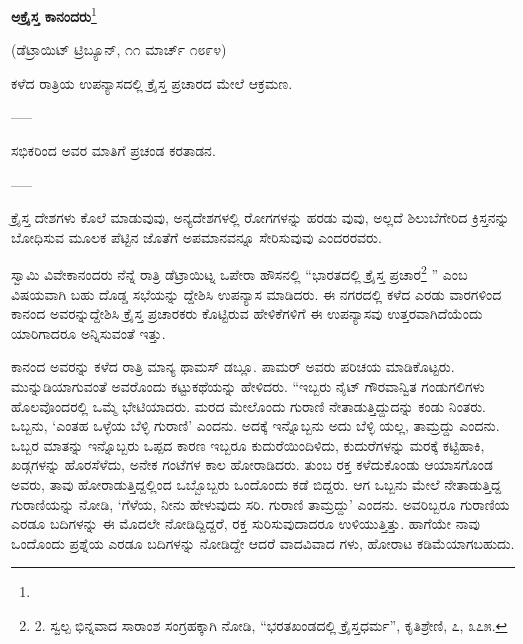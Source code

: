 \begin{center}
\textbf{ಅಕ್ರೈಸ್ತ ಕಾನಂದರು}\footnote{}
\end{center}

\begin{center}
(ಡೆಟ್ರಾಯಿಟ್ ಟ್ರಿಬ್ಯೂನ್, ೧೧ ಮಾರ್ಚ್ ೧೮೯೪)
\end{center}

\begin{center}
ಕಳೆದ ರಾತ್ರಿಯ ಉಪನ್ಯಾಸದಲ್ಲಿ ಕ್ರೈಸ್ತ ಪ್ರಚಾರದ ಮೇಲೆ ಆಕ್ರಮಣ.
\end{center}

\begin{center}
-----
\end{center}

\begin{center}
ಸಭಿಕರಿಂದ ಅವರ ಮಾತಿಗೆ ಪ್ರಚಂಡ ಕರತಾಡನ.
\end{center}

\begin{center}
-----
\end{center}

ಕ್ರೈಸ್ತ ದೇಶಗಳು ಕೊಲೆ ಮಾಡುವುವು, ಅನ್ಯದೇಶಗಳಲ್ಲಿ ರೋಗಗಳನ್ನು ಹರಡು ವುವು, ಅಲ್ಲದೆ ಶಿಲುಬೆಗೇರಿದ ಕ್ರಿಸ್ತನನ್ನು ಬೋಧಿಸುವ ಮೂಲಕ ಪೆಟ್ಟಿನ ಜೊತೆಗೆ ಅಪಮಾನವನ್ನೂ ಸೇರಿಸುವುವು ಎಂದರರವರು.

ಸ್ವಾಮಿ ವಿವೇಕಾನಂದರು ನೆನ್ನೆ ರಾತ್ರಿ ಡೆಟ್ರಾಯಿಟ್ನ ಒಪೇರಾ ಹೌಸನಲ್ಲಿ “ಭಾರತದಲ್ಲಿ ಕ್ರೈಸ್ತ ಪ್ರಚಾರ\footnote{2. ಸ್ವಲ್ಪ ಭಿನ್ನವಾದ ಸಾರಾಂಶ ಸಂಗ್ರಹಕ್ಕಾಗಿ ನೋಡಿ, “ಭರತಖಂಡದಲ್ಲಿ ಕ್ರೈಸ್ತಧರ್ಮ”, ಕೃತಿಶ್ರೇಣಿ, ೭, ೩೭೫.} ” ಎಂಬ ವಿಷಯವಾಗಿ ಬಹು ದೊಡ್ಡ ಸಭೆಯನ್ನು ದ್ದೇಶಿಸಿ ಉಪನ್ಯಾಸ ಮಾಡಿದರು. ಈ ನಗರದಲ್ಲಿ ಕಳೆದ ಎರಡು ವಾರಗಳಿಂದ ಕಾನಂದ ಅವರನ್ನುದ್ದೇಶಿಸಿ ಕ್ರೈಸ್ತ ಪ್ರಚಾರಕರು ಕೊಟ್ಟಿರುವ ಹೇಳಿಕೆಗಳಿಗೆ ಈ ಉಪನ್ಯಾಸವು ಉತ್ತರವಾಗಿದೆಯೆಂದು ಯಾರಿಗಾದರೂ ಅನ್ನಿಸುವಂತೆ ಇತ್ತು.

ಕಾನಂದ ಅವರನ್ನು ಕಳೆದ ರಾತ್ರಿ ಮಾನ್ಯ ಥಾಮಸ್ ಡಬ್ಲೂ. ಪಾಮರ್ ಅವರು ಪರಿಚಯ ಮಾಡಿಕೊಟ್ಟರು. ಮುನ್ನುಡಿಯಾಗುವಂತೆ ಅವರೊಂದು ಕಟ್ಟುಕಥೆಯನ್ನು ಹೇಳಿದರು. “ಇಬ್ಬರು ನೈಟ್ ಗೌರವಾನ್ವಿತ ಗಂಡುಗಲಿಗಳು ಹೊಲವೊಂದರಲ್ಲಿ ಒಮ್ಮೆ ಭೇಟಿಯಾದರು. ಮರದ ಮೇಲೊಂದು ಗುರಾಣಿ ನೇತಾಡುತ್ತಿದ್ದುದನ್ನು ಕಂಡು ನಿಂತರು. ಒಬ್ಬನು, ‘ಎಂತಹ ಒಳ್ಳೆಯ ಬೆಳ್ಳಿ ಗುರಾಣಿ’ ಎಂದನು. ಅದಕ್ಕೆ ಇನ್ನೊಬ್ಬನು ಅದು ಬೆಳ್ಳಿ ಯಲ್ಲ, ತಾಮ್ರದ್ದು ಎಂದನು. ಒಬ್ಬರ ಮಾತನ್ನು ಇನ್ನೊಬ್ಬರು ಒಪ್ಪದ ಕಾರಣ ಇಬ್ಬರೂ ಕುದುರೆಯಿಂದಿಳಿದು, ಕುದುರೆಗಳನ್ನು ಮರಕ್ಕೆ ಕಟ್ಟಿಹಾಕಿ, ಖಡ್ಗಗಳನ್ನು ಹೊರಸೆಳೆದು, ಅನೇಕ ಗಂಟೆಗಳ ಕಾಲ ಹೋರಾಡಿದರು. ತುಂಬ ರಕ್ತ ಕಳೆದುಕೊಂಡು ಆಯಾಸಗೊಂಡ ಅವರು, ತಾವು ಹೋರಾಡುತ್ತಿದ್ದಲ್ಲಿಂದ ಒಬ್ಬೊಬ್ಬರು ಒಂದೊಂದು ಕಡೆ ಬಿದ್ದರು. ಆಗ ಒಬ್ಬನು ಮೇಲೆ ನೇತಾಡುತ್ತಿದ್ದ ಗುರಾಣಿಯನ್ನು ನೋಡಿ, ‘ಗೆಳೆಯ, ನೀನು ಹೇಳುವುದು ಸರಿ. ಗುರಾಣಿ ತಾಮ್ರದ್ದು’ ಎಂದನು. ಅವರಿಬ್ಬರೂ ಗುರಾಣಿಯ ಎರಡೂ ಬದಿಗಳನ್ನು ಈ ಮೊದಲೇ ನೋಡಿದ್ದಿದ್ದರೆ, ರಕ್ತ ಸುರಿಸುವುದಾದರೂ ಉಳಿಯುತ್ತಿತ್ತು. ಹಾಗೆಯೇ ನಾವು ಒಂದೊಂದು ಪ್ರಶ್ನೆಯ ಎರಡೂ ಬದಿಗಳನ್ನು ನೋಡಿದ್ದೇ ಆದರೆ ವಾದವಿವಾದ ಗಳು, ಹೋರಾಟ ಕಡಿಮೆಯಾಗಬಹುದು.


